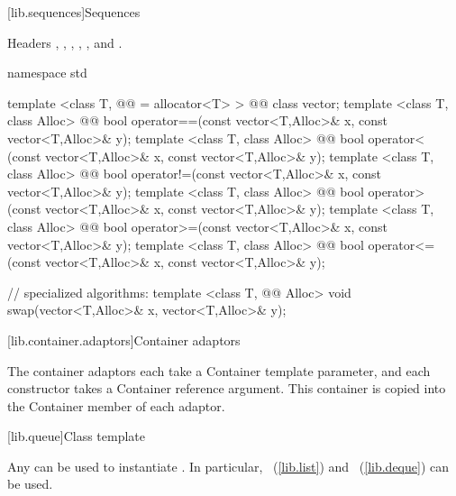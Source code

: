 \documentclass[american,twoside]{book}
\begin{document}
[lib.sequences]{Sequences}

\pnum
Headers , , , ,
, and .

%

\begin{codeblock}
namespace std {
  template <class T, @@ = allocator<T> > 
    @@ class vector;
  template <class T, class Alloc>
    @@
    bool operator==(const vector<T,Alloc>& x,
                    const vector<T,Alloc>& y);
  template <class T, class Alloc>
    @@
    bool operator< (const vector<T,Alloc>& x,
                    const vector<T,Alloc>& y);
  template <class T, class Alloc>
    @@
    bool operator!=(const vector<T,Alloc>& x,
                    const vector<T,Alloc>& y);
  template <class T, class Alloc>
    @@
    bool operator> (const vector<T,Alloc>& x,
                    const vector<T,Alloc>& y);
  template <class T, class Alloc>
    @@
    bool operator>=(const vector<T,Alloc>& x,
                    const vector<T,Alloc>& y);
  template <class T, class Alloc>
    @@
    bool operator<=(const vector<T,Alloc>& x,
                    const vector<T,Alloc>& y);

  // specialized algorithms:
  template <class T, @@ Alloc>
    void swap(vector<T,Alloc>& x, vector<T,Alloc>& y);
}
\end{codeblock}

\setcounter{subsection}{3}
[lib.container.adaptors]{Container adaptors}

\pnum
The container adaptors each take a Container template parameter,
and each constructor takes a Container reference argument.
This
container is copied into the Container member of each adaptor.

[lib.queue]{Class template }

\pnum
{}%
Any 
can be used to instantiate
.
In particular,
\
(\ref{lib.list})
and
\
(\ref{lib.deque})
can be used.
\end{document}
